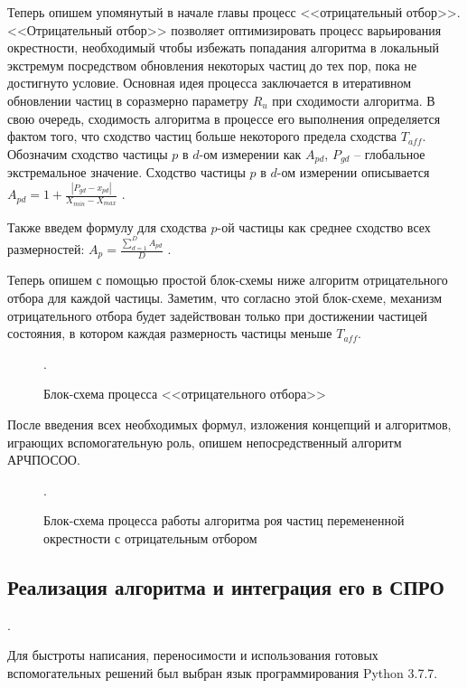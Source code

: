 Теперь опишем упомянутый в начале главы процесс <<отрицательный отбор>>. <<Отрицательный отбор>> позволяет оптимизировать процесс варьирования окрестности, необходимый чтобы избежать попадания алгоритма в локальный экстремум посредством  обновления некоторых частиц до тех пор, пока не достигнуто условие. Основная идея процесса заключается в итеративном обновлении частиц в соразмерно параметру $R_u$ при сходимости алгоритма. В свою очередь, сходимость алгоритма в процессе его выполнения определяется фактом того, что сходство частиц больше некоторого предела сходства $T_{aff}$. Обозначим сходство частицы $p$ в $d$-ом измерении как $A_{pd}$, $P_{gd}$ -- глобальное экстремальное значение.  %
Сходство частицы $p$ в $d$-ом измерении описывается $A_{pd} = 1 + \frac{|P_{gd} - x_{pd}|}{X_{min} - X_{max}}$ \cite[с. 520]{Cheng:2017}.

Также введем формулу для сходства $p$-ой частицы как среднее сходство всех размерностей: $A_{p} =  \frac {\sum_{d=1}^{D} A_{pd}} {D}$ \cite[с. 520]{Cheng:2017}.

Теперь опишем с помощью простой блок-схемы ниже алгоритм отрицательного отбора для каждой частицы. Заметим, что согласно этой блок-схеме, механизм отрицательного отбора будет задействован только при достижении частицей состояния, в котором  каждая  размерность частицы меньше $T_{aff}$.


\begin{figure*}[h!]
	\caption{Блок-схема процесса <<отрицательного отбора>>}.
\end{figure*} 

После введения всех необходимых формул, изложения концепций и алгоритмов, играющих вспомогательную роль, опишем непосредственный алгоритм АРЧПОСОО. 

\begin{figure*}
	\caption{Блок-схема процесса работы алгоритма роя частиц перемененной окрестности с отрицательным отбором}.
\end{figure*} 

\newpage 

\subsection{Реализация алгоритма и интеграция его в СПРО}.

Для быстроты написания, переносимости и использования готовых вспомогательных решений был выбран язык программирования Python 3.7.7. 

